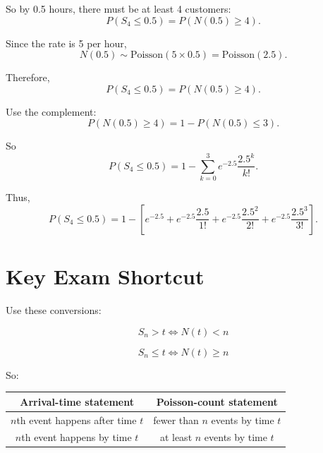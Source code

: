 \documentclass[12pt]{article}
\begin{document}
So by 0.5 hours, there must be at least 4 customers:
\[
P(S_4\leq 0.5)=P(N(0.5)\geq 4).
\]

Since the rate is 5 per hour,
\[
N(0.5)\sim \text{Poisson}(5\times 0.5)=\text{Poisson}(2.5).
\]

Therefore,
\[
P(S_4\leq 0.5)=P(N(0.5)\geq 4).
\]

Use the complement:
\[
P(N(0.5)\geq 4)=1-P(N(0.5)\leq 3).
\]

So
\[
P(S_4\leq 0.5)
=
1-\sum_{k=0}^{3}e^{-2.5}\frac{2.5^k}{k!}.
\]

Thus,
\[
\boxed{
P(S_4\leq 0.5)
=
1-\left[
e^{-2.5}
+e^{-2.5}\frac{2.5}{1!}
+e^{-2.5}\frac{2.5^2}{2!}
+e^{-2.5}\frac{2.5^3}{3!}
\right].
}
\]

\section*{Key Exam Shortcut}

Use these conversions:

\[
\boxed{S_n>t \iff N(t)<n}
\]

\[
\boxed{S_n\leq t \iff N(t)\geq n}
\]

So:

\begin{center}
\begin{tabular}{|c|c|}
\hline
\textbf{Arrival-time statement} & \textbf{Poisson-count statement}\\
\hline
\(n\)th event happens after time \(t\) & fewer than \(n\) events by time \(t\)\\
\hline
\(n\)th event happens by time \(t\) & at least \(n\) events by time \(t\)\\
\hline
\end{tabular}
\end{center}
\end{document}
